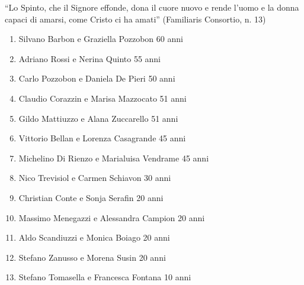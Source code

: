 
``Lo Spinto, che il Signore effonde, dona il cuore nuovo e rende l'uomo e la donna capaci di amarsi, come Cristo ci ha amati''
(Familiaris Consortio, n. 13)

\vfill

\begin{enumerate}
  \item Silvano Barbon e Graziella Pozzobon \hfill 60 anni
  \item Adriano Rossi e Nerina Quinto \hfill 55 anni
  \item Carlo Pozzobon e Daniela De Pieri \hfill 50 anni
  \item Claudio Corazzin e Marisa Mazzocato \hfill 51 anni
  \item Gildo Mattiuzzo e Alana Zuccarello \hfill 51 anni
  \item Vittorio Bellan e Lorenza Casagrande \hfill 45 anni
  \item Michelino Di Rienzo e Marialuisa Vendrame \hfill 45 anni
  \item Nico Trevisiol e Carmen Schiavon \hfill 30 anni
  \item Christian Conte e Sonja Serafin \hfill 20 anni
  \item Massimo Menegazzi e Alessandra Campion \hfill 20 anni
  \item Aldo Scandiuzzi e Monica Boiago \hfill 20 anni
  \item Stefano Zanusso e Morena Susin \hfill 20 anni
  \item Stefano Tomasella e Francesca Fontana \hfill 10 anni
\end{enumerate}

